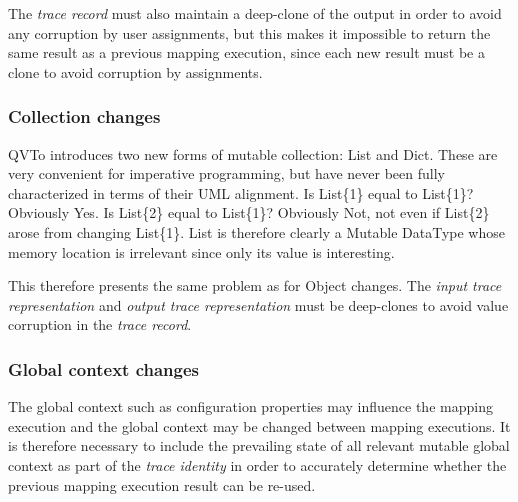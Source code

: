\documentclass[runningheads,a4paper]{llncs}
\begin{document}

The \emph{trace record} must also maintain a deep-clone of the output in order to avoid any corruption by user assignments, but this makes it impossible to return the same result as a previous mapping execution, since each new result must be a clone to avoid corruption by assignments.

\subsubsection{Collection changes}

QVTo introduces two new forms of mutable collection: List and Dict. These are very convenient for imperative programming, but have never been fully characterized in terms of their UML alignment. Is List\{1\} equal to List\{1\}? Obviously Yes. Is List\{2\} equal to List\{1\}? Obviously Not, not even if List\{2\} arose from changing List\{1\}. List is therefore clearly a Mutable DataType whose  memory location is irrelevant since only its value is interesting.

This therefore presents the same problem as for Object changes. The \emph{input trace representation} and \emph{output trace representation} must be deep-clones to avoid value corruption in the \emph{trace record}.

\subsubsection{Global context changes}

The global context such as configuration properties may influence the mapping execution and the global context may be changed between mapping executions. It is therefore necessary to include the prevailing state of all relevant mutable global context as part of the \emph{trace identity} in order to accurately determine whether the previous mapping execution result can be re-used.
\end{document}
